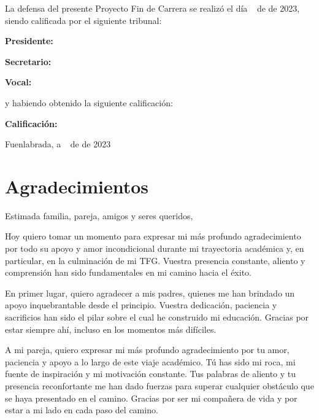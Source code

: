 \documentclass[a4paper, 12pt]{book}
\begin{document}
	\vspace{1cm}
	La defensa del presente Proyecto Fin de Carrera se realizó el día \qquad$\;\,$ de \qquad\qquad\qquad\qquad \newline de 2023, siendo calificada por el siguiente tribunal:
	
	
	\vspace{0.5cm}
	\textbf{Presidente:}
	
	\vspace{1.2cm}
	\textbf{Secretario:}
	
	\vspace{1.2cm}
	\textbf{Vocal:}
	
	
	\vspace{1.2cm}
	y habiendo obtenido la siguiente calificación:
	
	\vspace{1cm}
	\textbf{Calificación:}
	
	
	\vspace{1cm}
	\begin{flushright}
		Fuenlabrada, a \qquad$\;\,$ de \qquad\qquad\qquad\qquad de 2023
	\end{flushright}
	
	
	
	\chapter*{Agradecimientos}
	
	Estimada familia, pareja, amigos y seres queridos,
	
	Hoy quiero tomar un momento para expresar mi más profundo agradecimiento por todo su apoyo y amor incondicional durante mi trayectoria académica y, en particular, en la culminación de mi TFG. Vuestra presencia constante, aliento y comprensión han sido fundamentales en mi camino hacia el éxito.
	
	En primer lugar, quiero agradecer a mis padres, quienes me han brindado un apoyo inquebrantable desde el principio. Vuestra dedicación, paciencia y sacrificios han sido el pilar sobre el cual he construido mi educación. Gracias por estar siempre ahí, incluso en los momentos más difíciles.
		
	A mi pareja, quiero expresar mi más profundo agradecimiento por tu amor, paciencia y apoyo a lo largo de este viaje académico. Tú has sido mi roca, mi fuente de inspiración y mi motivación constante. Tus palabras de aliento y tu presencia reconfortante me han dado fuerzas para superar cualquier obstáculo que se haya presentado en el camino. Gracias por ser mi compañera de vida y por estar a mi lado en cada paso del camino.
	
\end{document}
